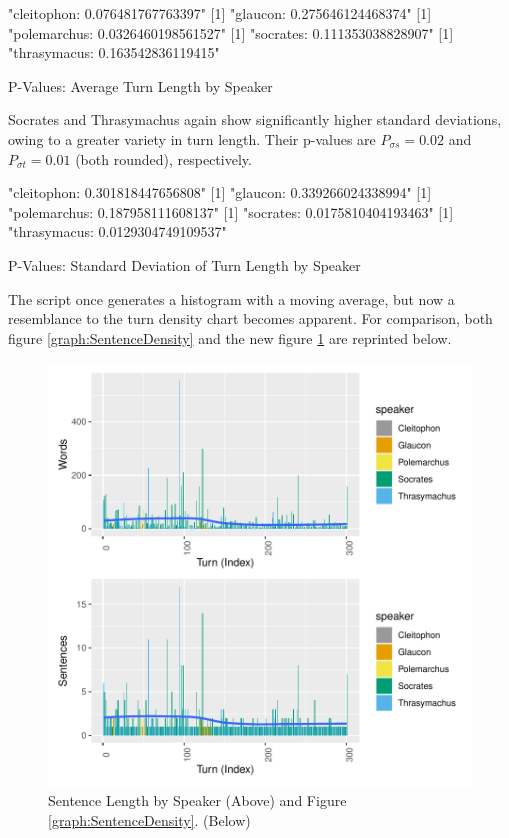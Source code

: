 \documentclass[noraggedright]{turabian-researchpaper}
\begin{document}
\begin{table}[htbp]
\begin{Schunk}
\begin{Soutput}
[1] "cleitophon: 0.076481767763397"
[1] "glaucon: 0.275646124468374"
[1] "polemarchus: 0.0326460198561527"
[1] "socrates: 0.111353038828907"
[1] "thrasymacus: 0.163542836119415"
\end{Soutput}
\end{Schunk}
\caption{P-Values: Average Turn Length by Speaker}
\label{tab:LenPval}
\end{table}

Socrates and Thrasymachus again show significantly higher standard deviations,
owing to a greater variety in turn length. Their p-values are
$P_{\sigma s} = 0.02$ and $P_{\sigma t} = 0.01$ (both rounded), respectively. 

\begin{table}[htbp]
\begin{Schunk}
\begin{Soutput}
[1] "cleitophon: 0.301818447656808"
[1] "glaucon: 0.339266024338994"
[1] "polemarchus: 0.187958111608137"
[1] "socrates: 0.0175810404193463"
[1] "thrasymacus: 0.0129304749109537"
\end{Soutput}
\end{Schunk}
\caption{P-Values: Standard Deviation of Turn Length by Speaker}
\label{tab:LSDPval}
\end{table}

The script once generates a histogram with a moving average, but now a
resemblance to the turn density chart becomes apparent. For comparison, both
figure \ref{graph:SentenceDensity} and the new figure \ref{graph:SentenceLength}
are reprinted below.

\begin{figure}[htbp]
\includegraphics{GreatFlood-Turn_Length}
\caption{Sentence Length by Speaker (Above) and Figure \ref{graph:SentenceDensity}. (Below)}
\label{graph:SentenceLength}
\end{figure}
\end{document}
